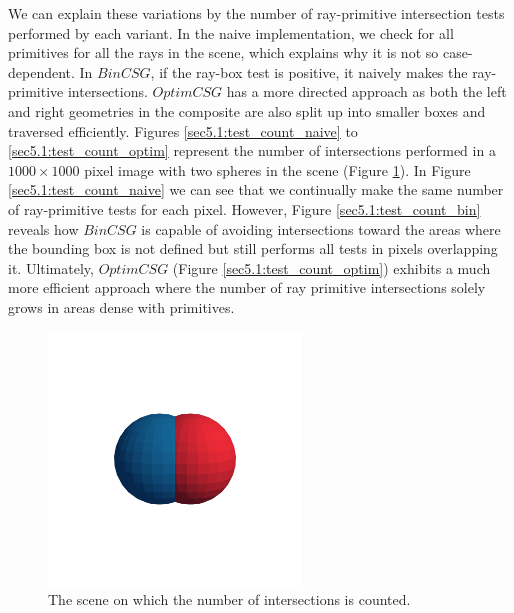\documentclass[a4paper,11pt,oneside]{article}
\begin{document}
We can explain these variations by the number of ray-primitive intersection tests performed by each variant. In the naive implementation, we check for all primitives for all the rays in the scene, which explains why it is not so case-dependent. In $BinCSG$, if the ray-box test is positive, it naively makes the ray-primitive intersections. $OptimCSG$ has a more directed approach as both the left and right geometries in the composite are also split up into smaller boxes and traversed efficiently. Figures \ref{sec5.1:test_count_naive} to \ref{sec5.1:test_count_optim} represent the number of intersections performed in a $1000 \times 1000$ pixel image with two spheres in the scene (Figure \ref{sec5.1:test_count_render}). In Figure \ref{sec5.1:test_count_naive} we can see that we continually make the same number of ray-primitive tests for each pixel. However, Figure \ref{sec5.1:test_count_bin} reveals how $BinCSG$ is capable of avoiding intersections toward the areas where the bounding box is not defined but still performs all tests in pixels overlapping it. Ultimately, $OptimCSG$ (Figure \ref{sec5.1:test_count_optim}) exhibits a much more efficient approach where the number of ray primitive intersections solely grows in areas dense with primitives.

\begin{figure}[H]
	\centering
	\includegraphics[width=0.6\textwidth]{section5/plots/union.png}
	\caption{The scene on which the number of intersections is counted.}
	\label{sec5.1:test_count_render}
\end{figure}
\end{document}
